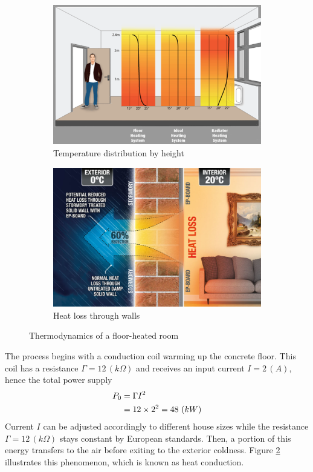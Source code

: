 \documentclass[../main.tex]{subfiles}
\begin{document}
\begin{figure}[H]
    \centering
    \begin{subfigure}{0.49\textwidth}
        \includegraphics[width=\linewidth]{figures/temp_dist.png}
        \caption{Temperature distribution by height \cite{warmup_heat_distribution}}
        \label{fig:temp_dist}
    \end{subfigure}
    \begin{subfigure}{0.49\textwidth}
        \includegraphics[width=\linewidth]{figures/conductive_loss.png}
        \caption{Heat loss through walls \cite{heatloss_thru_walls}}
        \label{fig:cond_loss}
    \end{subfigure}
    \caption{Thermodynamics of a floor-heated room}
    \label{fig:room_char}
\end{figure}

The process begins with a conduction coil warming up the concrete floor. This coil has a resistance $\Gamma = 12\,(k\Omega)$ and receives an input current $I = 2\,(A)$, hence the total power supply
\begin{align} \label{eq:psup}
    P_0 &= \Gamma I^2 \\
    &= 12 \times 2^2 = 48~(kW)  \notag
\end{align}
Current $I$ can be adjusted accordingly to different house sizes while the resistance $\Gamma = 12\,(k\Omega)$ stays constant by European standards. Then, a portion of this energy transfers to the air before exiting to the exterior coldness. Figure \ref{fig:cond_loss} illustrates this phenomenon, which is known as heat conduction. 
\end{document}
